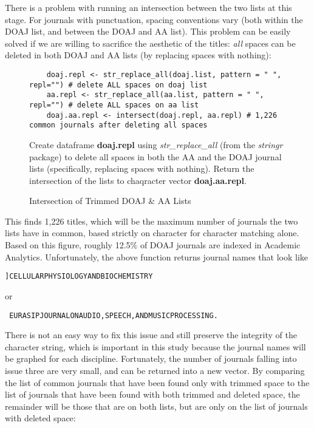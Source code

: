 \documentclass{article}
\begin{document}
There is a problem with running an intersection between the two lists at this stage.
For journals with punctuation, spacing conventions vary (both within the DOAJ list, and between the DOAJ and AA list).
This problem can be easily solved if we are willing to sacrifice the aesthetic of the titles: \textit{all } spaces can be deleted in both DOAJ and AA  lists (by replacing spaces with nothing):
\begin{figure}[htpb]
	\centering
	\begin{lstlisting}
	doaj.repl <- str_replace_all(doaj.list, pattern = " ", repl="") # delete ALL spaces on doaj list
	aa.repl <- str_replace_all(aa.list, pattern = " ", repl="") # delete ALL spaces on aa list
	doaj.aa.repl <- intersect(doaj.repl, aa.repl) # 1,226 common journals after deleting all spaces
	\end{lstlisting}
	\footnotesize{
		Create dataframe \textbf{doaj.repl} using \textit{str\_replace\_all} (from the \textit{stringr} package) to delete all spaces in both the AA and the DOAJ journal lists (specifically, replacing spaces with nothing). 
		Return the intersection of the lists to chaqracter vector \textbf{doaj.aa.repl}.
			}
	\caption{Intersection of Trimmed DOAJ \& AA Lists}
\end{figure}
This finds 1,226 titles, which will be the maximum number of journals the two lists have in common, based strictly on character for character matching alone.
Based on this figure, roughly 12.5\% of DOAJ journals are indexed in Academic Analytics.
Unfortunately, the above function returns journal names that look like \begin{verbatim}]CELLULARPHYSIOLOGYANDBIOCHEMISTRY \end{verbatim} or \begin{verbatim} EURASIPJOURNALONAUDIO,SPEECH,ANDMUSICPROCESSING. \end{verbatim}
There is not an easy way to fix this issue and still preserve the integrity of the character string, which is important in this study because the journal names will be graphed for each discipline.
Fortunately, the number of journals falling into issue three are very small, and can be returned into a new vector.
By comparing the list of common journals that have been found only with trimmed space to the list of journals that have been found with both trimmed and deleted space, the remainder will be those that are on both lists, but are only on the list of journals with deleted space:
\end{document}
